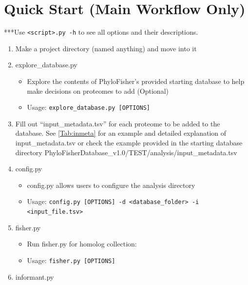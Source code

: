 \documentclass{article}
\def\code#1{\texttt{#1}}
\begin{document}
    \section{Quick Start (Main Workflow Only)}
    ***Use \code{<script>.py -h} to see all options and their descriptions.
    \begin{enumerate}[itemsep=12pt]
        \item Make a project directory (named anything) and move into it
        \item explore\_database.py
            \begin{itemize}
                \item Explore the contents of PhyloFisher’s provided starting database to help make decisions on proteomes to add (Optional)
                \item Usage: \code{explore\_database.py [OPTIONS]} 
            \end{itemize}
        \item Fill out “input\_metadata.tsv” for each proteome to be added to the database. See \autoref{Tab:inmeta} for an example and detailed explanation of input\_metadata.tsv or check the example provided in the starting database directory PhyloFisherDatabase\_v1.0/TEST/analysis/input\_metadata.tsv
        \item config.py
            \begin{itemize}[noitemsep,topsep=0pt]
                \item config.py allows users to configure the analysis directory
                \item Usage: \code{config.py [OPTIONS] -d <database\_folder> -i <input\_file.tsv>}
            \end{itemize}
            \item fisher.py
                \begin{itemize}[noitemsep,topsep=0pt]
                    \item Run fisher.py for homolog collection:
                    \item Usage: \code{fisher.py [OPTIONS]}
                \end{itemize}
            \item informant.py

\end{enumerate}
\end{document}
